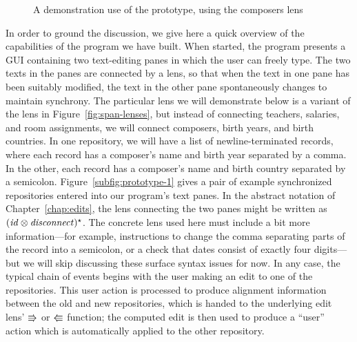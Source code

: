 \begin{figure}
    \centering
    \hfil
    \vspace{4ex}

    \hfil
    \vspace{4ex}

    \hfil
    \vspace{4ex}

    \hfil
    \vspace{4ex}

    \caption{A demonstration use of the prototype, using the composers lens}
    \label{fig:prototype-screenshots}
\end{figure}

In order to ground the discussion, we give here a quick overview of the
capabilities of the program we have built. When started, the program
presents a GUI containing two text-editing panes in which the user can
freely type. The two texts in the panes are connected by a lens, so that
when the text in one pane has been suitably modified, the text in the other
pane spontaneously changes to maintain synchrony. The particular lens we
will demonstrate below is a variant of the lens in
Figure~\ref{fig:span-lenses}, but instead of connecting teachers, salaries,
and room assignments, we will connect composers, birth years, and birth
countries. In one repository, we will have a list of newline-terminated
records, where each record has a composer's name and birth year separated by
a comma. In the other, each record has a composer's name and birth country
separated by a semicolon. Figure~\ref{subfig:prototype-1} gives a pair of
example synchronized repositories entered into our program's text panes. In
the abstract notation of Chapter~\ref{chap:edits}, the lens connecting the
two panes might be written as $(\mathit{id}\otimes\mathit{disconnect})^\star$. The concrete
lens used here must include a bit more information---for example,
instructions to change the comma separating parts of the record into a
semicolon, or a check that dates consist of exactly four digits---but we
will skip discussing these surface syntax issues for now. In any case, the
typical chain of events begins with the user making an edit to one of the
repositories. This user action is processed to produce alignment information
between the old and new repositories, which is handed to the underlying edit
lens' $\mathord{\Rrightarrow}$ or $\mathord{\Lleftarrow}$ function; the computed edit is then used to
produce a ``user'' action which is automatically applied to the other
repository.

